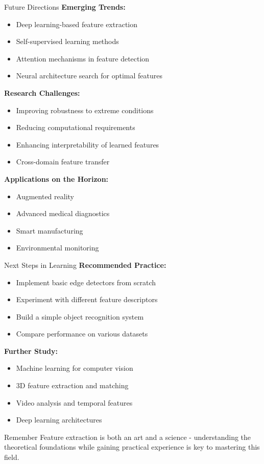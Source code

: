 \documentclass[aspectratio=169,10pt]{beamer}
\begin{document}
\begin{frame}{Future Directions}
    \textbf{Emerging Trends:}
    \begin{itemize}
        \item Deep learning-based feature extraction
        \item Self-supervised learning methods
        \item Attention mechanisms in feature detection
        \item Neural architecture search for optimal features
    \end{itemize}

    \textbf{Research Challenges:}
    \begin{itemize}
        \item Improving robustness to extreme conditions
        \item Reducing computational requirements
        \item Enhancing interpretability of learned features
        \item Cross-domain feature transfer
    \end{itemize}

    \textbf{Applications on the Horizon:}
    \begin{itemize}
        \item Augmented reality
        \item Advanced medical diagnostics
        \item Smart manufacturing
        \item Environmental monitoring
    \end{itemize}
\end{frame}

\begin{frame}{Next Steps in Learning}
    \textbf{Recommended Practice:}
    \begin{itemize}
        \item Implement basic edge detectors from scratch
        \item Experiment with different feature descriptors
        \item Build a simple object recognition system
        \item Compare performance on various datasets
    \end{itemize}

    \textbf{Further Study:}
    \begin{itemize}
        \item Machine learning for computer vision
        \item 3D feature extraction and matching
        \item Video analysis and temporal features
        \item Deep learning architectures
    \end{itemize}

    \begin{alertblock}{Remember}
        Feature extraction is both an art and a science - understanding the theoretical foundations while gaining practical experience is key to mastering this field.
    \end{alertblock}
\end{frame}
\end{document}
